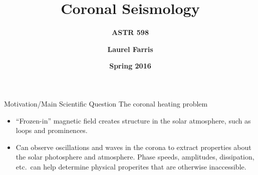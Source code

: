 \documentclass[table]{beamer}
\title{\textbf{Coronal Seismology}}
\subtitle{\textbf{ASTR 598}}
\date{\textbf{Spring 2016}}
\author{\textbf{Laurel Farris}}
\begin{document}
{
\begin{frame}
    \titlepage{}
\end{frame}}%

\begin{frame}{Motivation/Main Scientific Question}
    {The coronal heating problem}
    \begin{itemize}
        \item ``Frozen-in'' magnetic field creates structure in the
            solar atmosphere, such as loops and prominences.
        \item Can observe oscillations and waves in the corona to extract
            properties about the solar photosphere and atmosphere.
            Phase speeds, amplitudes, dissipation, etc.\ can help determine
            physical properites that are otherwise inaccessible.
    \end{itemize}
\end{frame}%
\end{document}
